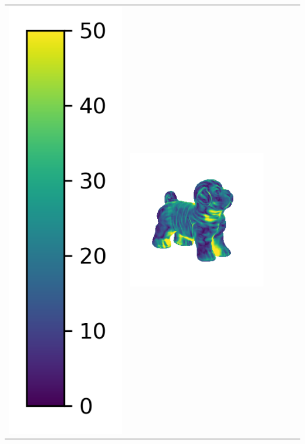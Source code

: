 \begin{center}
\begin{tabularx}{\linewidth}{@{}Y@{}Y@{}Y@{}Y@{}Y@{}Y@{}}
\includegraphics[width=0.2\linewidth]{semisynthetic/colorbar_error_vertical.png} &
\includegraphics[width=\linewidth]{semisynthetic/20160617_17_ours_err.png} &

\end{tabularx}
\end{center}
